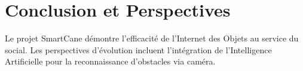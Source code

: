 \documentclass[12pt,a4paper]{report}
\begin{document}
\chapter{Conclusion et Perspectives}
Le projet SmartCane démontre l'efficacité de l'Internet des Objets au service du social. Les perspectives d'évolution incluent l'intégration de l'Intelligence Artificielle pour la reconnaissance d'obstacles via caméra.



\end{document}
